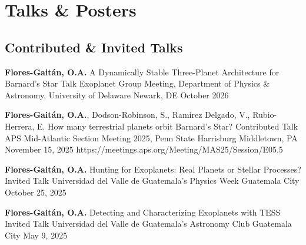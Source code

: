 \section{Talks \& Posters}

\subsection*{Contributed \& Invited Talks}
\begin{onecolentry}
\begin{etaremune}
    \resumeTalkEntry
        {\textbf{Flores-Gaitán, O.A.}}
        {A Dynamically Stable Three-Planet Architecture for Barnard's Star}
        {Talk}
        {Exoplanet Group Meeting, Department of Physics \& Astronomy, University of Delaware}
        {Newark, DE}
        {October 2026}
        {}

    \resumeTalkEntry
        {\textbf{Flores-Gaitán, O.A.}, Dodson-Robinson, S., Ramirez Delgado, V., Rubio-Herrera, E.}
        {How many terrestrial planets orbit Barnard's Star?}
        {Contributed Talk}
        {APS Mid-Atlantic Section Meeting 2025, Penn State Harrisburg}
        {Middletown, PA}
        {November 15, 2025}
        {https://meetings.aps.org/Meeting/MAS25/Session/E05.5}

    \resumeTalkEntry
        {\textbf{Flores-Gaitán, O.A.}}
        {Hunting for Exoplanets: Real Planets or Stellar Processes?}
        {Invited Talk}
        {Universidad del Valle de Guatemala's Physics Week}
        {Guatemala City}
        {October 25, 2025}
        {}

    \resumeTalkEntry
        {\textbf{Flores-Gaitán, O.A.}}
        {Detecting and Characterizing Exoplanets with TESS}
        {Invited Talk}
        {Universidad del Valle de Guatemala's Astronomy Club}
        {Guatemala City}
        {May 9, 2025}
        {}
\end{etaremune}
\end{onecolentry}

\vspace{0.10cm}

